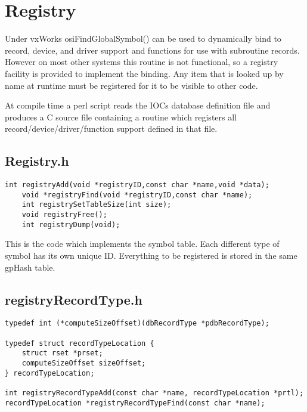 \chapter{Registry}
\label{Registry}

Under vxWorks osiFindGlobalSymbol() can be used to dynamically bind to record, device, and driver support and 
functions for use with subroutine records. However on most other systems this routine is not functional, so a registry 
facility is provided to implement the binding. Any item that is looked up by name at runtime must be registered for it to be 
visible to other code.

At compile time a perl script reads the IOCs database definition file and produces a C source file containing a routine 
which registers all record/device/driver/function support defined in that file.

\section{Registry.h}

\begin{verbatim}
int registryAdd(void *registryID,const char *name,void *data);
    void *registryFind(void *registryID,const char *name);
    int registrySetTableSize(int size);
    void registryFree();
    int registryDump(void);
\end{verbatim}

This is the code which implements the symbol table. Each different type of symbol has its own unique ID. Everything to 
be registered is stored in the same gpHash table.

\section{registryRecordType.h}

\begin{verbatim}
typedef int (*computeSizeOffset)(dbRecordType *pdbRecordType);

typedef struct recordTypeLocation {
    struct rset *prset;
    computeSizeOffset sizeOffset;
} recordTypeLocation;

int registryRecordTypeAdd(const char *name, recordTypeLocation *prtl);
recordTypeLocation *registryRecordTypeFind(const char *name);
\end{verbatim}

